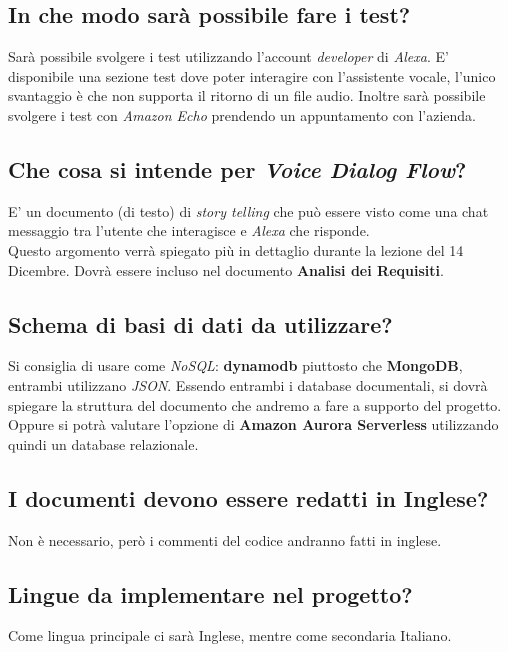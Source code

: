 \documentclass[a4paper,12pt]{article}
\begin{document}
	\subsection{In che modo sarà possibile fare i test?}
	Sarà possibile svolgere i test utilizzando l'account \textit{developer} di \textit{Alexa}. E' disponibile una sezione test dove poter interagire con l'assistente vocale, l'unico svantaggio è che non supporta il ritorno di un file audio. Inoltre sarà possibile svolgere i test con \textit{Amazon Echo} prendendo un appuntamento con l'azienda.

	\subsection{Che cosa si intende per \textit{Voice Dialog Flow}?}
	E' un documento (di testo) di \textit{story telling} che può essere visto come una chat messaggio tra l'utente che interagisce e \textit{Alexa} che risponde. \\
	Questo argomento verrà spiegato più in dettaglio durante la lezione del 14 Dicembre. Dovrà essere incluso nel documento \textbf{Analisi dei Requisiti}.
	
	\subsection{Schema di basi di dati da utilizzare?}
	Si consiglia di usare come \textit{NoSQL}: \textbf{dynamodb} piuttosto che \textbf{MongoDB}, entrambi utilizzano \textit{JSON}. Essendo entrambi i database documentali, si dovrà spiegare la struttura del documento che andremo a fare a supporto del progetto. Oppure si potrà valutare l'opzione di \textbf{Amazon Aurora Serverless} utilizzando quindi un database relazionale.
	
	\subsection{I documenti devono essere redatti in Inglese?}
	Non è necessario, però i commenti del codice andranno fatti in inglese.
	
	\subsection{Lingue da implementare nel progetto?}
	Come lingua principale ci sarà Inglese, mentre come secondaria Italiano.
	
\end{document}
